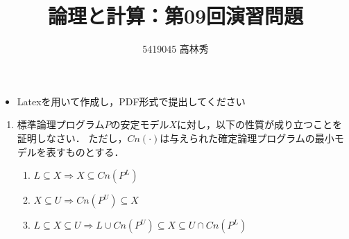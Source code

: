 \documentclass[dvipdfmx]{jsarticle}
\def\NO{09}
\def\LECTURENAME{論理と計算}
\begin{document}
\title{\LECTURENAME{}：第\NO{}回演習問題}

\author{5419045 高林秀}

\date{}
\maketitle

\begin{itemize}
\item Latexを用いて作成し，PDF形式で提出してください
\end{itemize}


\vspace*{\baselineskip}

\begin{enumerate}\setlength{\itemsep}{\baselineskip}

\item 標準論理プログラム$P$の安定モデル$X$に対し，以下の性質が成り立つことを証明しなさい．
  ただし，$Cn(\cdot)$は与えられた確定論理プログラムの最小モデルを表すものとする．
  \begin{enumerate}
  \item $L\subseteq X \Rightarrow X\subseteq Cn(P^L)$
  \item $X\subseteq U \Rightarrow Cn(P^U)\subseteq X$
  \item $L\subseteq X\subseteq U \Rightarrow  L\cup Cn(P^U)\subseteq X\subseteq U\cap Cn(P^L)$
  \end{enumerate}

\end{enumerate}
\end{document}
